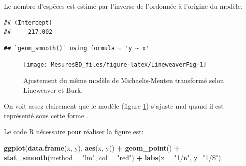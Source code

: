 \documentclass[
  11pt,
  french,
  a4paper,
  extrafontsizes,onecolumn,openright
  ]{memoir}
\newenvironment{Shaded}{\begin{snugshade}}{\end{snugshade}}
\newcommand{\AttributeTok}[1]{\textcolor[rgb]{0.13,0.29,0.53}{#1}}
\newcommand{\DecValTok}[1]{\textcolor[rgb]{0.00,0.00,0.81}{#1}}
\newcommand{\FunctionTok}[1]{\textcolor[rgb]{0.13,0.29,0.53}{\textbf{#1}}}
\newcommand{\NormalTok}[1]{#1}
\newcommand{\OtherTok}[1]{\textcolor[rgb]{0.56,0.35,0.01}{#1}}
\newcommand{\SpecialCharTok}[1]{\textcolor[rgb]{0.81,0.36,0.00}{\textbf{#1}}}
\newcommand{\StringTok}[1]{\textcolor[rgb]{0.31,0.60,0.02}{#1}}
\begin{document}
Le nombre d'espèces est estimé par l'inverse de l'ordonnée à l'origine du modèle.

\scriptsize

\begin{Shaded}
\end{Shaded}

\begin{verbatim}
## (Intercept) 
##     217.002
\end{verbatim}

\normalsize



\scriptsize

\begin{verbatim}
## `geom_smooth()` using formula = 'y ~ x'
\end{verbatim}

\begin{figure}

{\centering \texttt{[image: MesuresBD\_files/figure-latex/LineweaverFig-1]} 

}

\caption{Ajustement du même modèle de Michaelis-Menten transformé selon Lineweaver et Burk.}\label{fig:LineweaverFig}
\end{figure}

\normalsize

On voit assez clairement que le modèle (figure \ref{fig:LineweaverFig}) s'ajuste mal quand il est représenté sous cette forme \autocite{Raaijmakers1987}.

Le code R nécessaire pour réaliser la figure est:

\scriptsize

\begin{Shaded}
\begin{Highlighting}[]
\FunctionTok{ggplot}\NormalTok{(}\FunctionTok{data.frame}\NormalTok{(x, y), }\FunctionTok{aes}\NormalTok{(x, y)) }\SpecialCharTok{+} 
  \FunctionTok{geom\_point}\NormalTok{() }\SpecialCharTok{+}
  \FunctionTok{stat\_smooth}\NormalTok{(}\AttributeTok{method =} \StringTok{"lm"}\NormalTok{, }\AttributeTok{col =} \StringTok{"red"}\NormalTok{) }\SpecialCharTok{+}
  \FunctionTok{labs}\NormalTok{(}\AttributeTok{x =} \StringTok{"1/n"}\NormalTok{, }\AttributeTok{y=}\StringTok{"1/S"}\NormalTok{)}
\end{Highlighting}
\end{Shaded}
\end{document}
